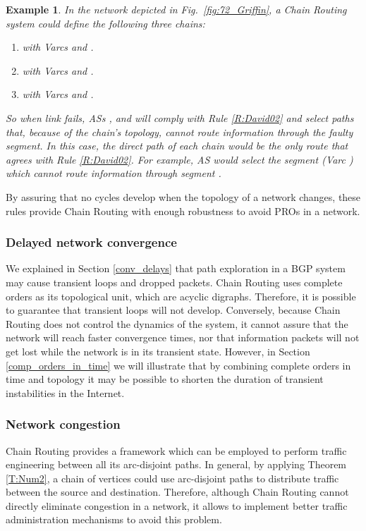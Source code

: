\documentclass[5p,twocolumn]{elsarticle}
\newtheorem{example}{Example}
\begin{document}
\begin{example}
In the network depicted in Fig.\ \ref{fig:72_Griffin}, a Chain Routing system could define the following three chains:

\begin{enumerate}
	\item  with Varcs  and .
	\item  with Varcs  and .
	\item  with Varcs  and .
\end{enumerate}

So when link  fails, ASs ,  and  will comply with Rule \ref{R:David02} and select paths that, because of the chain's topology, cannot route information through the faulty  segment. In this case, the direct path of each chain would be the only route that agrees with Rule \ref{R:David02}. For example, AS  would select the segment  (Varc ) which cannot route information through segment .
\end{example}

By assuring that no cycles develop when the topology of a network changes, these rules provide Chain Routing with enough robustness to avoid PROs in a network.


\subsubsection{Delayed network convergence}

We explained in Section \ref{conv_delays} that path exploration in a BGP system may cause transient loops and dropped packets. Chain Routing uses complete orders as its topological unit, which are acyclic digraphs. Therefore, it is possible to guarantee that transient loops will not develop. Conversely, because Chain Routing does not control the dynamics of the system, it cannot assure that the network will reach faster convergence times, nor that information packets will not get lost while the network is in its transient state. However, in Section \ref{comp_orders_in_time} we will illustrate that by combining complete orders in time and topology it may be possible to shorten the duration of transient instabilities in the Internet.


\subsubsection{Network congestion}

Chain Routing provides a framework which can be employed to perform traffic engineering between all its arc-disjoint paths. In general, by applying Theorem \ref{T:Num2}, a chain of  vertices could use  arc-disjoint paths to distribute traffic between the source and destination. Therefore, although Chain Routing cannot directly eliminate congestion in a network, it allows to implement better traffic administration mechanisms to avoid this problem.
\end{document}

